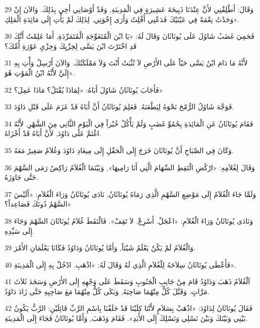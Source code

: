 \par 29 وَقَالَ: أَطْلِقْنِي لأَنَّ عِنْدَنَا ذَبِيحَةَ عَشِيرَةٍ فِي الْمَدِينَةِ, وَقَدْ أَوْصَانِي أَخِي بِذَلِكَ. وَالآنَ إِنْ وَجَدْتُ نِعْمَةً فِي عَيْنَيْكَ فَدَعْنِي أُفْلِتُ وَأَرَى إِخْوَتِي. لِذَلِكَ لَمْ يَأْتِ إِلَى مَائِدَةِ الْمَلِكِ».
\par 30 فَحَمِيَ غَضَبُ شَاوُلَ عَلَى يُونَاثَانَ وَقَالَ لَهُ: «يَا ابْنَ الْمُتَعَوِّجَةِ الْمُتَمَرِّدَةِ, أَمَا عَلِمْتُ أَنَّكَ قَدِ اخْتَرْتَ ابْنَ يَسَّى لِخِزْيِكَ وَخِزْيِ عَوْرَةِ أُمِّكَ؟
\par 31 لأَنَّهُ مَا دَامَ ابْنُ يَسَّى حَيّاً عَلَى الأَرْضِ لاَ تُثْبَتُ أَنْتَ وَلاَ مَمْلَكَتُكَ. وَالآنَ أَرْسِلْ وَأْتِ بِهِ إِلَيَّ لأَنَّهُ ابْنُ الْمَوْتِ هُوَ».
\par 32 فَأَجَابَ يُونَاثَانُ شَاوُلَ أَبَاهُ: «لِمَاذَا يُقْتَلُ؟ مَاذَا عَمِلَ؟»
\par 33 فَوَجَّهَ شَاوُلُ الرُّمْحَ نَحْوَهُ لِيَطْعَنَهُ. فَعَلِمَ يُونَاثَانُ أَنَّ أَبَاهُ قَدْ عَزَمَ عَلَى قَتْلِ دَاوُدَ.
\par 34 فَقَامَ يُونَاثَانُ عَنِ الْمَائِدَةِ بِحُمُوِّ غَضَبٍ وَلَمْ يَأْكُلْ خُبْزاً فِي الْيَوْمِ الثَّانِي مِنَ الشَّهْرِ, لأَنَّهُ اغْتَمَّ عَلَى دَاوُدَ, لأَنَّ أَبَاهُ قَدْ أَخْزَاهُ.
\par 35 وَكَانَ فِي الصَّبَاحِ أَنَّ يُونَاثَانَ خَرَجَ إِلَى الْحَقْلِ إِلَى مِيعَادِ دَاوُدَ وَغُلاَمٌ صَغِيرٌ مَعَهُ.
\par 36 وَقَالَ لِغُلاَمِهِ: «ارْكُضِ الْتَقِطِ السِّهَامَ الَّتِي أَنَا رَامِيهَا». وَبَيْنَمَا الْغُلاَمُ رَاكِضٌ رَمَى السَّهْمَ حَتَّى جَاوَزَهُ.
\par 37 وَلَمَّا جَاءَ الْغُلاَمُ إِلَى مَوْضِعِ السَّهْمِ الَّذِي رَمَاهُ يُونَاثَانُ, نَادَى يُونَاثَانُ وَرَاءَ الْغُلاَمِ: «أَلَيْسَ السَّهْمُ دُونَكَ فَصَاعِداً؟»
\par 38 وَنَادَى يُونَاثَانُ وَرَاءَ الْغُلاَمِ: «اعْجَلْ. أَسْرِعْ. لاَ تَقِفْ». فَالْتَقَطَ غُلاَمُ يُونَاثَانَ السَّهْمَ وَجَاءَ إِلَى سَيِّدِهِ.
\par 39 وَالْغُلاَمُ لَمْ يَكُنْ يَعْلَمُ شَيْئاً, وَأَمَّا يُونَاثَانُ وَدَاوُدُ فَكَانَا يَعْلَمَانِ الأَمْرَ.
\par 40 فَأَعْطَى يُونَاثَانُ سِلاَحَهُ لِلْغُلاَمِ الَّذِي لَهُ وَقَالَ لَهُ: «اذْهَبِ. ادْخُلْ بِهِ إِلَى الْمَدِينَةِ».
\par 41 اَلْغُلاَمُ ذَهَبَ وَدَاوُدُ قَامَ مِنْ جَانِبِ الْجَنُوبِ وَسَقَطَ عَلَى وَجْهِهِ إِلَى الأَرْضِ وَسَجَدَ ثَلاَثَ مَرَّاتٍ. وَقَبَّلَ كُلٌّ مِنْهُمَا صَاحِبَهُ, وَبَكَى كُلٌّ مِنْهُمَا مَعَ صَاحِبِهِ حَتَّى زَادَ دَاوُدُ.
\par 42 فَقَالَ يُونَاثَانُ لِدَاوُدَ: «اذْهَبْ بِسَلاَمٍ لأَنَّنَا كِلَيْنَا قَدْ حَلَفْنَا بِاسْمِ الرَّبِّ قَائِلَيْنِ: الرَّبُّ يَكُونُ بَيْنِي وَبَيْنَكَ وَبَيْنَ نَسْلِي وَنَسْلِكَ إِلَى الأَبَدِ». فَقَامَ وَذَهَبَ, وَأَمَّا يُونَاثَانُ فَجَاءَ إِلَى الْمَدِينَةِ.

